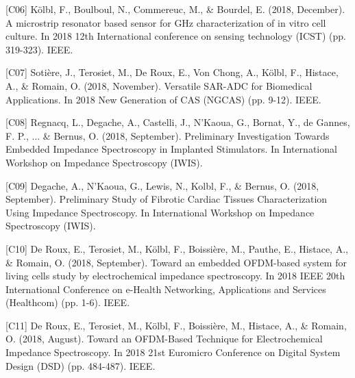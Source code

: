 \begin{cvskills}    
  \cvskill
    {[C06]} %
    {Kölbl, F., Boulboul, N., Commereuc, M., \& Bourdel, E. (2018, December). A microstrip resonator based sensor for GHz characterization of in vitro cell culture. In 2018 12th International conference on sensing technology (ICST) (pp. 319-323). IEEE.} %
\end{cvskills}  
\begin{cvskills}    
  \cvskill
    {[C07]} %
    {Sotière, J., Terosiet, M., De Roux, E., Von Chong, A., Kölbl, F., Histace, A., \& Romain, O. (2018, November). Versatile SAR-ADC for Biomedical Applications. In 2018 New Generation of CAS (NGCAS) (pp. 9-12). IEEE.} %
\end{cvskills}  
\begin{cvskills}    
  \cvskill
    {[C08]} %
    {Regnacq, L., Degache, A., Castelli, J., N'Kaoua, G., Bornat, Y., de Gannes, F. P., ... \& Bernus, O. (2018, September). Preliminary Investigation Towards Embedded Impedance Spectroscopy in Implanted Stimulators. In International Workshop on Impedance Spectroscopy (IWIS).} %
\end{cvskills}  
\begin{cvskills}    
  \cvskill
    {[C09]} %
    {Degache, A., N'Kaoua, G., Lewis, N., Kolbl, F., \& Bernus, O. (2018, September). Preliminary Study of Fibrotic Cardiac Tissues Characterization Using Impedance Spectroscopy. In International Workshop on Impedance Spectroscopy (IWIS).} %
\end{cvskills}  
\begin{cvskills}    
  \cvskill
    {[C10]} %
    {De Roux, E., Terosiet, M., Kölbl, F., Boissière, M., Pauthe, E., Histace, A., \& Romain, O. (2018, September). Toward an embedded OFDM-based system for living cells study by electrochemical impedance spectroscopy. In 2018 IEEE 20th International Conference on e-Health Networking, Applications and Services (Healthcom) (pp. 1-6). IEEE.} %
\end{cvskills}  
\begin{cvskills}    
  \cvskill
    {[C11]} %
    {De Roux, E., Terosiet, M., Kölbl, F., Boissière, M., Histace, A., \& Romain, O. (2018, August). Toward an OFDM-Based Technique for Electrochemical Impedance Spectroscopy. In 2018 21st Euromicro Conference on Digital System Design (DSD) (pp. 484-487). IEEE.} %
\end{cvskills}  
